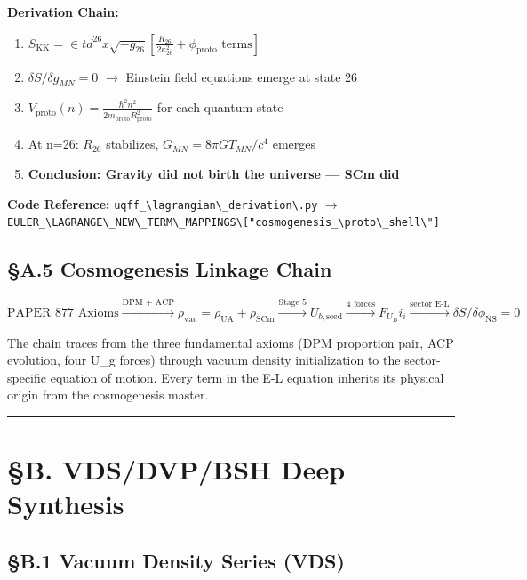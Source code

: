\documentclass[12pt,a4paper]{article}
\begin{document}
\textbf{Derivation Chain:}

\begin{enumerate}
  \item $S_{\mathrm{KK}} = \in t d^{26}x \sqrt{-g_{26}} \left[\frac{R_{26}}{2\kappa_{26}^2} + \phi_{\mathrm{proto}} \text{ terms}\right]$
  \item $\delta S / \delta g_{MN} = 0$ $\to$ Einstein field equations emerge at state 26
  \item $V_{\mathrm{proto}}(n) = \frac{\hbar^2 n^2}{2 m_{\mathrm{proto}} R_{\mathrm{proto}}^2}$ for each quantum state
  \item At n=26: $R_{26}$ stabilizes, $G_{MN} = 8\pi G T_{MN}/c^4$ emerges
  \item \textbf{Conclusion: Gravity did not birth the universe --- SCm did}
\end{enumerate}

\textbf{Code Reference:} \texttt{uqff\_\textbackslash {lagrangian\textbackslash \_derivation\textbackslash }.py} $\to$ \texttt{EULER\_\textbackslash {LAGRANGE\textbackslash \_NEW\textbackslash \_TERM\textbackslash \_MAPPINGS\textbackslash }["cosmogenesis\_\textbackslash {proto\textbackslash \_shell\textbackslash }"]}

\subsection{\S{}A.5 Cosmogenesis Linkage Chain}

\begin{equation}
\text{PAPER\_877 Axioms} \xrightarrow{\text{DPM + ACP}} \rho_{\mathrm{vac}} = \rho_{\mathrm{UA}} + \rho_{\mathrm{SCm}} \xrightarrow{\text{Stage 5}} U_{b,\mathrm{seed}} \xrightarrow{\text{4 forces}} F_U_Bi_i \xrightarrow{\text{sector E-L}} \delta S/\delta \phi_{\mathrm{NS}} = 0
\end{equation}

The chain traces from the three fundamental axioms (DPM proportion pair, ACP evolution, four U\_g forces) through vacuum density initialization to the sector-specific equation of motion. Every term in the E-L equation inherits its physical origin from the cosmogenesis master.

\medskip\hrule\medskip

\section{\S{}B. VDS/DVP/BSH Deep Synthesis}

\subsection{\S{}B.1 Vacuum Density Series (VDS)}
\end{document}
